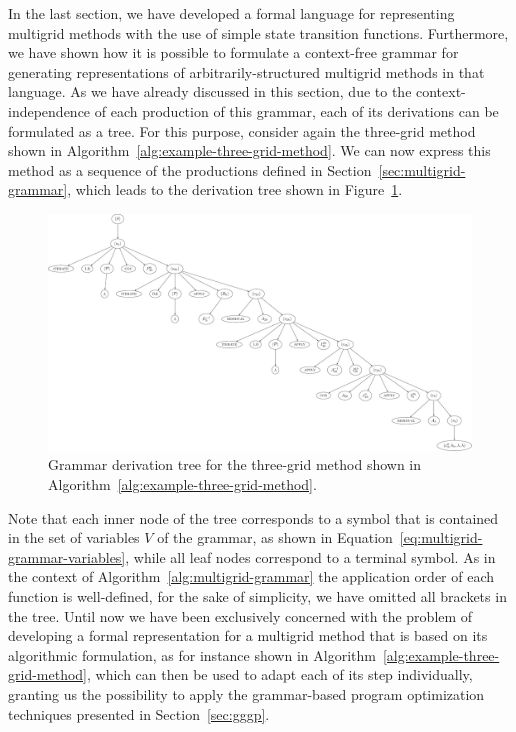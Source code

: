 In the last section, we have developed a formal language for representing multigrid methods with the use of simple state transition functions.
Furthermore, we have shown how it is possible to formulate a context-free grammar for generating representations of arbitrarily-structured multigrid methods in that language.
As we have already discussed in this section, due to the context-independence of each production of this grammar, each of its derivations can be formulated as a tree.
For this purpose, consider again the three-grid method shown in Algorithm~\ref{alg:example-three-grid-method}.
We can now express this method as a sequence of the productions defined in Section~\ref{sec:multigrid-grammar}, which leads to the derivation tree shown in Figure~\ref{fig:example-three-grid-method-derivation-tree}.
\begin{figure}
	\centering
	\includegraphics[width=\textwidth]{figures/trees/three_grid_method_grammar_tree.pdf}
	\caption{Grammar derivation tree for the three-grid method shown in Algorithm~\ref{alg:example-three-grid-method}.}
	\label{fig:example-three-grid-method-derivation-tree}
\end{figure}
Note that each inner node of the tree corresponds to a symbol that is contained in the set of variables $V$ of the grammar, as shown in Equation~\eqref{eq:multigrid-grammar-variables}, while all leaf nodes correspond to a terminal symbol.
As in the context of Algorithm~\ref{alg:multigrid-grammar} the application order of each function is well-defined, for the sake of simplicity, we have omitted all brackets in the tree.
Until now we have been exclusively concerned with the problem of developing a formal representation for a multigrid method that is based on its algorithmic formulation, as for instance shown in Algorithm~\ref{alg:example-three-grid-method}, which can then be used to adapt each of its step individually, granting us the possibility to apply the grammar-based program optimization techniques presented in Section~\ref{sec:gggp}.
